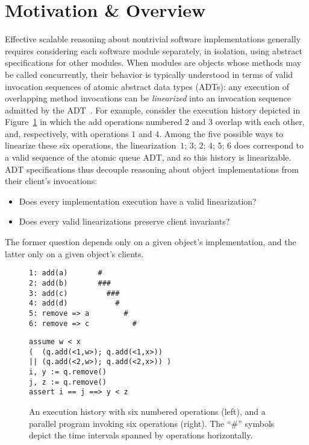 \section{Motivation \& Overview}
\label{sec:motivation}

Effective scalable reasoning about nontrivial software implementations generally
requires considering each software module separately, in isolation, using
abstract specifications for other modules. When modules are objects whose
methods may be called concurrently, their behavior is typically understood in
terms of valid invocation sequences of atomic abstract data types (ADTs): any
execution of overlapping method invocations can be \emph{linearized} into an
invocation sequence admitted by the ADT~\cite{journals/toplas/HerlihyW90}. For
example, consider the execution history depicted in Figure~\ref{fig:clients} in
which the add operations numbered $2$ and $3$ overlap with each other, and,
respectively, with operations $1$ and $4$. Among the five possible ways to
linearize these six operations, the linearization~$1$; $3$; $2$; $4$; $5$; $6$
does correspond to a valid sequence of the atomic queue ADT, and so this history
is linearizable. ADT specifications thus decouple reasoning about object
implementations from their client’s invocations:
\begin{itemize}

  \item Does every implementation execution have a valid linearization?

  \item Does every valid linearizations preserve client invariants?

\end{itemize}
The former question depends only on a given object’s implementation, and the
latter only on a given object’s clients.

\begin{figure}[t]
  \begin{minipage}{0.43\linewidth}
    \begin{verbatim}
1: add(a)       #
2: add(b)       ###
3: add(c)         ###
4: add(d)           #
5: remove => a        #
6: remove => c          #
    \end{verbatim}
  \end{minipage}
  \hfill
  \begin{minipage}{0.55\linewidth}
    \begin{verbatim}
assume w < x
(  (q.add(<1,w>); q.add(<1,x>))
|| (q.add(<2,w>); q.add(<2,x>)) )
i, y := q.remove()
j, z := q.remove()
assert i == j ==> y < z
    \end{verbatim}
  \end{minipage}
  \caption{An execution history with six numbered operations (left),
    and a parallel program invoking six operations (right). The “\#” symbols
    depict the time intervals spanned by operations horizontally.}
  \label{fig:clients}
\end{figure}

